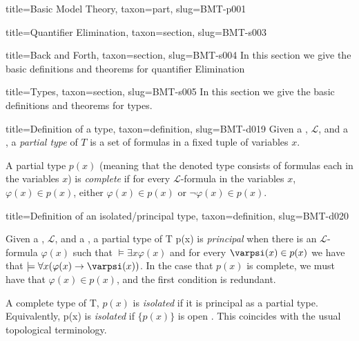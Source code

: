 \documentclass[a4paper]{article}
\begin{document}
\begin{tree}{title={Basic Model Theory}, taxon={part}, slug={BMT-p001}}
\begin{tree}{title={Quantifier Elimination}, taxon={section}, slug={BMT-s003}}
\end{tree}


  
  
\begin{tree}{title={Back and Forth}, taxon={section}, slug={BMT-s004}}
In this section we give the basic definitions and theorems for quantifier Elimination
\end{tree}


  
  
\begin{tree}{title={Types}, taxon={section}, slug={BMT-s005}}
In this section we give the basic definitions and theorems for types.
\begin{tree}{title={Definition of a type}, taxon={definition}, slug={BMT-d019}}
Given a , \(\mathcal {L}\), and a , a \emph{partial type} of \(T\) is a  set of formulas in a fixed tuple of variables \(x\).\par{A partial type \(p(x)\) (meaning that the denoted type consists of formulas each in the variables \(x\)) is \emph{complete} if for every \(\mathcal {L}\)-formula in the variables \(x\), \(\varphi (x) \in  p(x)\), either \(\varphi (x) \in  p(x)\) or \(\neg   \varphi (x) \in  p(x)\).}
\end{tree}

\begin{tree}{title={Definition of an isolated/principal type}, taxon={definition}, slug={BMT-d020}}

    Given a , \(\mathcal {L}\), and a ,
    a partial type of T {p(x)} is \emph{principal} when there is an \(\mathcal {L}\)-formula \(\varphi (x)\) such that
    \(\models   \exists  x  \varphi (x)\) and for every \(\varpsi (x)  \in  p(x)\) we have that
    \(\models   \forall  x ( \varphi (x)  \rightarrow   \varpsi (x))\).
    In the case that \(p(x)\) is complete, we must have that \(\varphi (x) \in  p(x)\),
    and the first condition is redundant.
\par{
    A complete type of T, \(p(x)\) is \emph{isolated} if it is principal as a partial type.
    Equivalently, {p(x)} is \emph{isolated} if \(\{ p(x) \}\) is open .
    This coincides with the usual topological terminology.
}
\end{tree}


\end{tree}
\end{tree}
\end{document}
